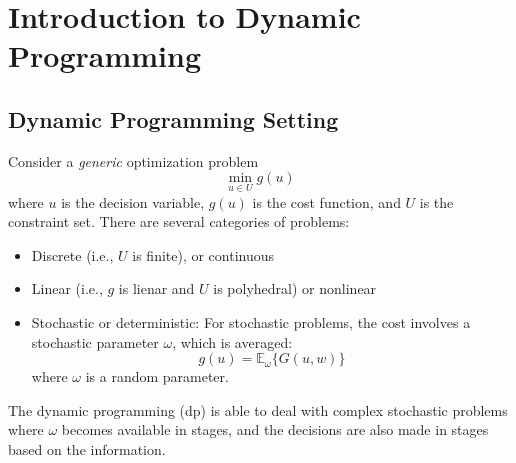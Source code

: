 \chapter{Introduction to Dynamic Programming}

\section{Dynamic Programming Setting}
Consider a \emph{generic} optimization problem
\[
\min_{u\in U}g(u)
\]
where $u$ is the decision variable, $g(u)$ is the cost function, and $U$ is the constraint set.
There are several categories of problems:
\begin{itemize}
\item
Discrete (i.e., $U$ is finite), or continuous
\item
Linear (i.e., $g$ is lienar and $U$ is polyhedral) or nonlinear
\item
Stochastic or deterministic: For stochastic problems, the cost involves a stochastic parameter $\omega$, which is averaged:
\[
g(u)=\mathbb{E}_{\omega}\{G(u,w)\}
\]
where $\omega$ is a random parameter.
\end{itemize}
The dynamic programming (dp) is able to deal with complex stochastic problems where $\omega$ becomes available in stages, and the decisions are also made in stages based on the information.


